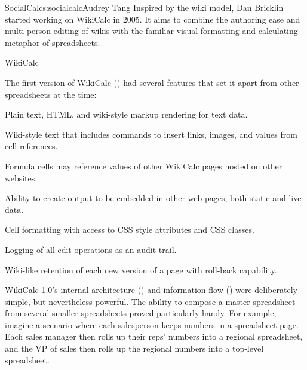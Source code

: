 \begin{aosachapter}{SocialCalc}{s:socialcalc}{Audrey Tang}
Inspired by the wiki model, Dan Bricklin started working on WikiCalc
in 2005.  It aims to combine the authoring ease and multi-person
editing of wikis with the familiar visual formatting and calculating
metaphor of spreadsheets.

\begin{aosasect1}{WikiCalc}

The first version of WikiCalc () had
several features that set it apart from other spreadsheets at the
time:

\begin{aosaitemize}

  \item Plain text, HTML, and wiki-style markup rendering for text data.

  \item Wiki-style text that includes commands to insert links, images,
  and values from cell references.

  \item Formula cells may reference values of other WikiCalc pages
  hosted on other websites.

  \item Ability to create output to be embedded in other web pages, both
  static and live data.

  \item Cell formatting with access to CSS style attributes and CSS
  classes.

  \item Logging of all edit operations as an audit trail.

  \item Wiki-like retention of each new version of a page with roll-back
  capability.

\end{aosaitemize}




WikiCalc 1.0's internal architecture () and
information flow () were deliberately simple,
but nevertheless powerful.  The ability to compose a master
spreadsheet from several smaller spreadsheets proved particularly
handy.  For example, imagine a scenario where each salesperson keeps
numbers in a spreadsheet page.  Each sales manager then rolls up their
reps' numbers into a regional spreadsheet, and the VP of sales then
rolls up the regional numbers into a top-level spreadsheet.


\end{aosasect1}
\end{aosachapter}
